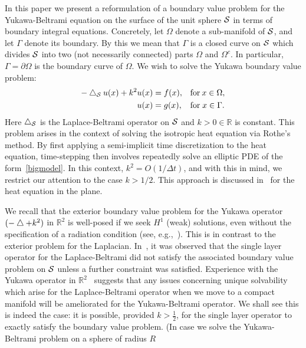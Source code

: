 In this paper we present a reformulation of a boundary value problem
for the Yukawa-Beltrami equation on the surface of the unit sphere
$\S$  in terms of boundary integral equations. Concretely, let $\Omega$ denote a sub-manifold of $\S$, and let
$\Gamma$ denote its boundary. By this we mean that $\Gamma$ is a closed
curve  on $\S$ which divides $\S$ into two (not necessarily connected)
parts $\Omega$ and $\Omega^{c}$. In particular, $\Gamma =
\partial\Omega$ is the boundary curve of $\Omega$. We wish to solve the Yukawa boundary value problem:
\begin{subequations}
\label{bigmodel}
  \begin{align}
    -\lap_\S u(x)+k^2  u(x)&= f({ x}), && \mbox{for} \: x \in \Omega, \\
    u(x)&=g(x), &&\mbox{for} \; x \in \Gamma. 
  \end{align}
\end{subequations}
Here $\lap_{\S}$ is the Laplace-Beltrami operator on $\S$ and $k>0 \in
\mathbb{R}$ is constant. This  problem arises in the context of solving
the isotropic heat equation via Rothe's method. By first applying a
semi-implicit time discretization to the heat equation,  
time-stepping then involves repeatedly solve an elliptic PDE  of the
form~\eqref{bigmodel}. In this context, $k^2 = O(1/\Delta t)$, and with
this in mind, we restrict our attention to the case $k>1/2$.  This
approach is discussed in~\cite{rothe:heat} for the heat equation in the
plane. 

We recall that the exterior boundary value problem for the Yukawa
operator $(-\lap + k^2)$  in $\mathbb{R}^2$ is well-posed if we seek
$H^1$ (weak) solutions, even without the specification of a radiation
condition (see, e.g.,~\cite{gatica}). This is in contrast to the
exterior problem for the Laplacian.  In~\cite{gemmrich}, it was observed
that the single layer operator for the Laplace-Beltrami did not satisfy
the associated boundary value problem on $\S$ unless a further
constraint was satisfied. Experience with the Yukawa operator in
$\mathbb{R}^2$~\cite{kro:qua2011,qua2011} suggests that any issues
concerning unique solvability which arise for the Laplace-Beltrami
operator when we move to a compact manifold will be ameliorated for the
Yukawa-Beltrami operator.  We shall see this is indeed the case: it is
possible, provided $k>\frac{1}{2}$, for the single layer operator to
exactly satisfy the boundary value problem. (In case we solve the
Yukawa-Beltrami problem on a sphere of radius $R$

